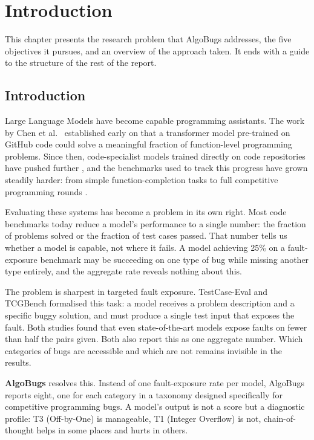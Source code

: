\chapter{Introduction}

This chapter presents the research problem that AlgoBugs addresses, the five objectives it pursues, and an overview of the approach taken. It ends with a guide to the structure of the rest of the report.

\section{Introduction}

Large Language Models have become capable programming assistants. The work by Chen et al.\ \cite{chen2021evaluating} established early on that a transformer model pre-trained on GitHub code could solve a meaningful fraction of function-level programming problems. Since then, code-specialist models trained directly on code repositories have pushed further \cite{guo2024deepseek}, and the benchmarks used to track this progress have grown steadily harder: from simple function-completion tasks to full competitive programming rounds \cite{li2022competition, hendrycks2021apps}.

Evaluating these systems has become a problem in its own right. Most code benchmarks today reduce a model's performance to a single number: the fraction of problems solved or the fraction of test cases passed. That number tells us whether a model is capable, not where it fails. A model achieving 25\% on a fault-exposure benchmark may be succeeding on one type of bug while missing another type entirely, and the aggregate rate reveals nothing about this.

The problem is sharpest in targeted fault exposure. TestCase-Eval \cite{yang2025testcase} and TCGBench \cite{cao2025tcgbench} formalised this task: a model receives a problem description and a specific buggy solution, and must produce a single test input that exposes the fault. Both studies found that even state-of-the-art models expose faults on fewer than half the pairs given. Both also report this as one aggregate number. Which categories of bugs are accessible and which are not remains invisible in the results.

\textbf{AlgoBugs} resolves this. Instead of one fault-exposure rate per model, AlgoBugs reports eight, one for each category in a taxonomy designed specifically for competitive programming bugs. A model's output is not a score but a diagnostic profile: T3 (Off-by-One) is manageable, T1 (Integer Overflow) is not, chain-of-thought helps in some places and hurts in others.

